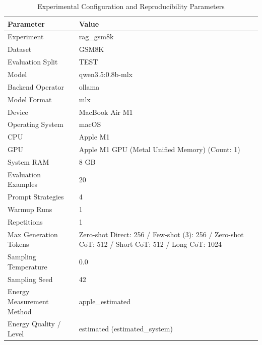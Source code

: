 \begin{table}
\caption{Experimental Configuration and Reproducibility Parameters}
\label{tab:experimental_configuration}
\begin{tabular}{ll}
\toprule
Parameter & Value \\
\midrule
Experiment & rag\_gsm8k \\
Dataset & GSM8K \\
Evaluation Split & TEST \\
Model & qwen3.5:0.8b-mlx \\
Backend Operator & ollama \\
Model Format & mlx \\
Device & MacBook Air M1 \\
Operating System & macOS \\
CPU & Apple M1 \\
GPU & Apple M1 GPU (Metal Unified Memory) (Count: 1) \\
System RAM & 8 GB \\
Evaluation Examples & 20 \\
Prompt Strategies & 4 \\
Warmup Runs & 1 \\
Repetitions & 1 \\
Max Generation Tokens & Zero-shot Direct: 256 / Few-shot (3): 256 / Zero-shot CoT: 512 / Short CoT: 512 / Long CoT: 1024 \\
Sampling Temperature & 0.0 \\
Sampling Seed & 42 \\
Energy Measurement Method & apple\_estimated \\
Energy Quality / Level & estimated (estimated\_system) \\
\bottomrule
\end{tabular}
\end{table}
